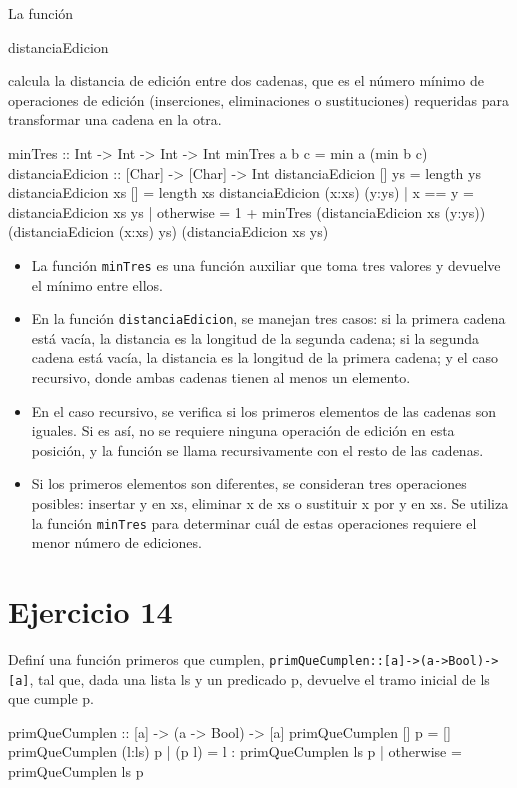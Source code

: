 \documentclass{article}
\begin{document}
La función \begin{haskell}distanciaEdicion\end{haskell} calcula la distancia de edición entre dos cadenas, que es el número mínimo de operaciones de edición (inserciones, eliminaciones o sustituciones) requeridas para transformar una cadena en la otra.
\begin{haskell}
minTres :: Int -> Int -> Int -> Int
minTres a b c = min a (min b c)
distanciaEdicion :: [Char] -> [Char] -> Int
distanciaEdicion [] ys = length ys
distanciaEdicion xs [] = length xs
distanciaEdicion (x:xs) (y:ys)
  | x == y = distanciaEdicion xs ys
  | otherwise = 1 + minTres (distanciaEdicion xs (y:ys)) (distanciaEdicion (x:xs) ys) (distanciaEdicion xs ys)
\end{haskell}
\begin{itemize}
\item 
La función \verb|minTres| es una función auxiliar que toma tres valores y devuelve el mínimo entre ellos.
\item 
En la función \verb|distanciaEdicion|, se manejan tres casos: si la primera cadena está vacía, la distancia es la longitud de la segunda cadena; si la segunda cadena está vacía, la distancia es la longitud de la primera cadena; y el caso recursivo, donde ambas cadenas tienen al menos un elemento.
\item 
En el caso recursivo, se verifica si los primeros elementos de las cadenas son iguales. Si es así, no se requiere ninguna operación de edición en esta posición, y la función se llama recursivamente con el resto de las cadenas.
\item 
Si los primeros elementos son diferentes, se consideran tres operaciones posibles: insertar y en xs, eliminar x de xs o sustituir x por y en xs. Se utiliza la función \verb|minTres| para determinar cuál de estas operaciones requiere el menor número de ediciones.
\end{itemize}

\section*{Ejercicio 14}
Definí una función primeros que cumplen, \verb|primQueCumplen::[a]->(a->Bool)->[a]|, tal que, dada una lista ls y un predicado p, devuelve el tramo inicial de ls que cumple p.
\begin{haskell}
primQueCumplen :: [a] -> (a -> Bool) -> [a]
primQueCumplen [] p = []
primQueCumplen (l:ls) p | (p l) = l : primQueCumplen ls p
                        | otherwise = primQueCumplen ls p
\end{haskell}
    
\end{document}
